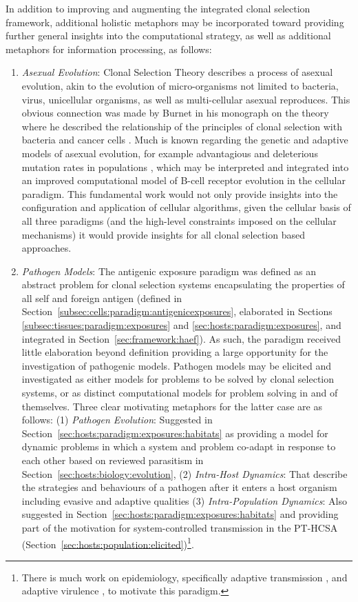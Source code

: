 In addition to improving and augmenting the integrated clonal selection framework, additional holistic metaphors may be incorporated toward providing further general insights into the computational strategy, as well as additional metaphors for information processing, as follows:

\begin{enumerate}
	\item \emph{Asexual Evolution}: Clonal Selection Theory describes a process of asexual evolution, akin to the evolution of micro-organisms not limited to bacteria, virus, unicellular organisms, as well as multi-cellular asexual reproduces. This obvious connection was made by Burnet in his monograph on the theory where he described the relationship of the principles of clonal selection with bacteria and cancer cells \cite{Burnet1959}. Much is known regarding the genetic and adaptive models of asexual evolution, for example advantagious and deleterious mutation rates in populations \cite{Gerrish1998, Rouzine2003}, which may be interpreted and integrated into an improved computational model of B-cell receptor evolution in the cellular paradigm. This fundamental work would not only provide insights into the configuration and application of cellular algorithms, given the cellular basis of all three paradigms (and the high-level constraints imposed on the cellular mechanisms) it would provide insights for all clonal selection based approaches.
	\item \emph{Pathogen Models}: The antigenic exposure paradigm was defined as an abstract problem for clonal selection systems encapsulating the properties of all self and foreign antigen (defined in Section~\ref{subsec:cells:paradigm:antigenicexposures}, elaborated in Sections \ref{subsec:tissues:paradigm:exposures} and \ref{sec:hosts:paradigm:exposures}, and integrated in Section~\ref{sec:framework:haef}). As such, the paradigm received little elaboration beyond definition providing a large opportunity for the investigation of pathogenic models. Pathogen models may be elicited and investigated as either models for problems to be solved by clonal selection systems, or as distinct computational models for problem solving in and of themselves. Three clear motivating metaphors for the latter case are as follows: (1) \emph{Pathogen Evolution}: Suggested in Section~\ref{sec:hosts:paradigm:exposures:habitats} as providing a model for dynamic problems in which a system and problem co-adapt in response to each other based on reviewed parasitism in Section~\ref{sec:hosts:biology:evolution}, (2) \emph{Intra-Host Dynamics}: That describe the strategies and behaviours of a pathogen after it enters a host organism including evasive and adaptive qualities \cite{Andre2003, Ganusov2002} (3) \emph{Intra-Population Dynamics}: Also suggested in Section~\ref{sec:hosts:paradigm:exposures:habitats} and providing part of the motivation for system-controlled transmission in the PT-HCSA (Section~\ref{sec:hosts:population:elicited})\footnote{There is much work on epidemiology, specifically adaptive transmission \cite{Bonhoeffer1994}, and adaptive virulence \cite{Regoes2000}, to motivate this paradigm.}. 

\end{enumerate}
